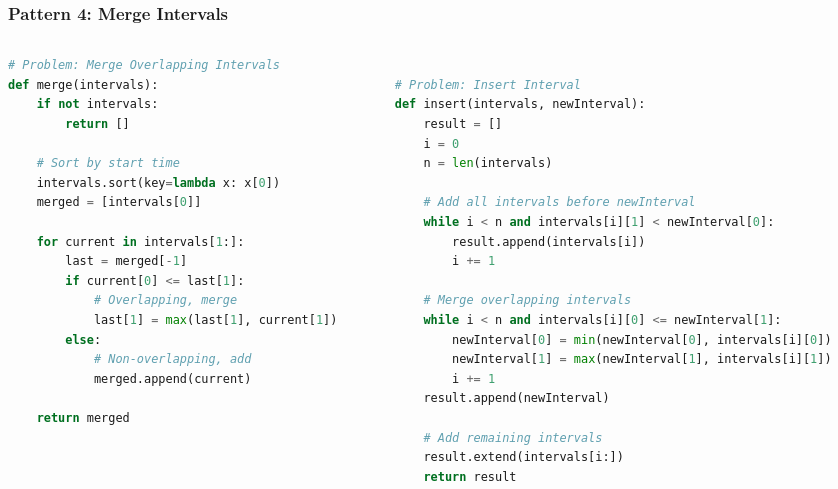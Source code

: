 \begin{frame}[fragile]\frametitle{Pattern 4: Merge Intervals}
\begin{columns}
    \begin{column}[T]{0.5\linewidth}
	
     \begin{lstlisting}[language=python, basicstyle=\tiny]
# Problem: Merge Overlapping Intervals
def merge(intervals):
    if not intervals:
        return []
    
    # Sort by start time
    intervals.sort(key=lambda x: x[0])
    merged = [intervals[0]]
    
    for current in intervals[1:]:
        last = merged[-1]
        if current[0] <= last[1]:
            # Overlapping, merge
            last[1] = max(last[1], current[1])
        else:
            # Non-overlapping, add
            merged.append(current)
    
    return merged

      \end{lstlisting}
	  
    \end{column}
    \begin{column}[T]{0.5\linewidth}
      \begin{lstlisting}[language=python, basicstyle=\tiny]

# Problem: Insert Interval
def insert(intervals, newInterval):
    result = []
    i = 0
    n = len(intervals)
    
    # Add all intervals before newInterval
    while i < n and intervals[i][1] < newInterval[0]:
        result.append(intervals[i])
        i += 1
    
    # Merge overlapping intervals
    while i < n and intervals[i][0] <= newInterval[1]:
        newInterval[0] = min(newInterval[0], intervals[i][0])
        newInterval[1] = max(newInterval[1], intervals[i][1])
        i += 1
    result.append(newInterval)
    
    # Add remaining intervals
    result.extend(intervals[i:])
    return result
      \end{lstlisting}
    \end{column}
  \end{columns}
\end{frame}

